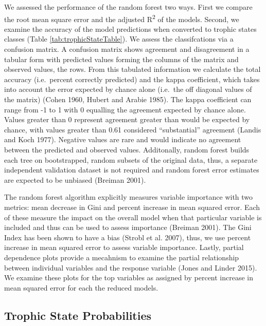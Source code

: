 \documentclass[11pt,]{article}
\begin{document}
We assessed the performance of the random forest two ways. First we
compare the root mean square error and the adjusted R\textsuperscript{2}
of the models. Second, we examine the accuracy of the model predictions
when converted to trophic states classes (Table
\ref{tab:trophicStateTable}). We assess the classifcations via a
confusion matrix. A confusion matrix shows agreement and disagreement in
a tabular form with predicted values forming the columns of the matrix
and observed values, the rows. From this tabulated information we
calculate the total accuracy (i.e.~percent correctly predicted) and the
kappa coefficient, which takes into account the error expected by chance
alone (i.e.~the off diagonal values of the matrix) (Cohen 1960, Hubert
and Arabie 1985). The kappa coefficient can range from -1 to 1 with 0
equalling the agreement expected by chance alone. Values greater than 0
represent agreement greater than would be expected by chance, with
values greater than 0.61 considered ``substantial'' agreement (Landis
and Koch 1977). Negative values are rare and would indicate no agreement
between the predicted and observed values. Additonally, random forest
builds each tree on bootstrapped, random subsets of the original data,
thus, a separate independent validation dataset is not required and
random forest error estimates are expected to be unbiased (Breiman
2001).

The random forest algorithm explicitly measures variable importance with
two metrics: mean decrease in Gini and percent increase in mean squared
error. Each of these measure the impact on the overall model when that
particular variable is included and thus can be used to assess
importance (Breiman 2001). The Gini Index has been shown to have a bias
(Strobl et al. 2007), thus, we use percent increase in mean squared
error to assess variable importance. Lastly, partial dependence plots
provide a mecahnism to examine the partial relationship between
individual variables and the response variable (Jones and Linder 2015).
We examine these plots for the top variables as assigned by percent
increase in mean squared error for each the reduced models.

\subsection{Trophic State
Probabilities}\label{trophic-state-probabilities}
\end{document}
